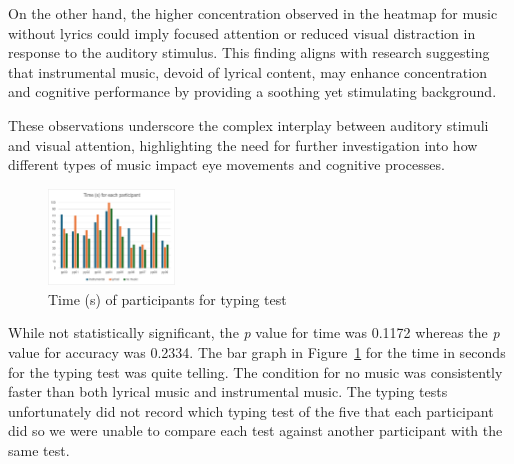 \documentclass[manuscript, screen, review]{acmart} %
\begin{document}
On the other hand, the higher concentration observed in the heatmap for music without lyrics could imply focused attention or reduced visual distraction in response to the auditory stimulus. This finding aligns with research suggesting that instrumental music, devoid of lyrical content, may enhance concentration and cognitive performance by providing a soothing yet stimulating background.

These observations underscore the complex interplay between auditory stimuli and visual attention, highlighting the need for further investigation into how different types of music impact eye movements and cognitive processes.


\begin{figure}
  \includegraphics[width=0.3\textwidth]{time}
  \caption{Time (s) of participants for typing test}
  \label{timeL}
\end{figure}

While not statistically significant, the \textit{p} value for time was 0.1172 whereas the \textit{p} value for accuracy was 0.2334.
The bar graph in Figure~\ref{timeL} for the time in seconds for the typing test was quite telling. The condition for no music was consistently faster than both
lyrical music and instrumental music. The typing tests unfortunately did not record which typing test of the five that each participant did so we
were unable to compare each test against another participant with the same test.
\end{document}
